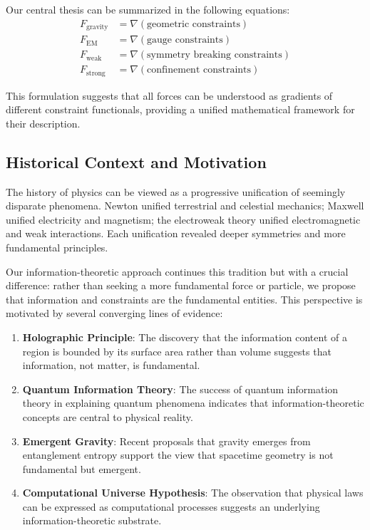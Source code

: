 \documentclass[11pt,a4paper]{article}
\begin{document}
Our central thesis can be summarized in the following equations:
\begin{align}
F_{\text{gravity}} &= \nabla(\text{geometric constraints}) \label{eq:gravity}\\
F_{\text{EM}} &= \nabla(\text{gauge constraints}) \label{eq:em}\\
F_{\text{weak}} &= \nabla(\text{symmetry breaking constraints}) \label{eq:weak}\\
F_{\text{strong}} &= \nabla(\text{confinement constraints}) \label{eq:strong}
\end{align}

This formulation suggests that all forces can be understood as gradients of different constraint functionals, providing a unified mathematical framework for their description.

\subsection{Historical Context and Motivation}

The history of physics can be viewed as a progressive unification of seemingly disparate phenomena. Newton unified terrestrial and celestial mechanics; Maxwell unified electricity and magnetism; the electroweak theory unified electromagnetic and weak interactions. Each unification revealed deeper symmetries and more fundamental principles.

Our information-theoretic approach continues this tradition but with a crucial difference: rather than seeking a more fundamental force or particle, we propose that information and constraints are the fundamental entities. This perspective is motivated by several converging lines of evidence:

\begin{enumerate}
\item \textbf{Holographic Principle}: The discovery that the information content of a region is bounded by its surface area rather than volume suggests that information, not matter, is fundamental.

\item \textbf{Quantum Information Theory}: The success of quantum information theory in explaining quantum phenomena indicates that information-theoretic concepts are central to physical reality.

\item \textbf{Emergent Gravity}: Recent proposals that gravity emerges from entanglement entropy support the view that spacetime geometry is not fundamental but emergent.

\item \textbf{Computational Universe Hypothesis}: The observation that physical laws can be expressed as computational processes suggests an underlying information-theoretic substrate.
\end{enumerate}
\end{document}

